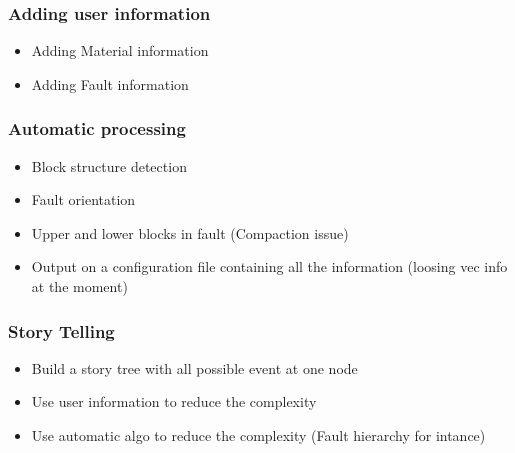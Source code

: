 \documentclass{beamer}
\begin{document}
	\begin{frame}
	\frametitle{Adding user information}
	\begin{itemize}
    \item Adding Material information
    \item Adding Fault information
    \end{itemize}
	\end{frame}	


	\begin{frame}
	\frametitle{Automatic processing}
	\begin{itemize}
    \item Block structure detection
    \item Fault orientation
    \item Upper and lower blocks in fault (Compaction issue)
    \item Output on a configuration file containing all the information (loosing vec info at the moment)

    \end{itemize}
	\end{frame}	


	\begin{frame}
	\frametitle{Story Telling}
	\begin{itemize}
	\item Build a story tree with all possible event at one node
	\item Use user information to reduce the complexity
	\item Use automatic algo to reduce the complexity (Fault hierarchy for intance)
    \end{itemize}
	\end{frame}
\end{document}
